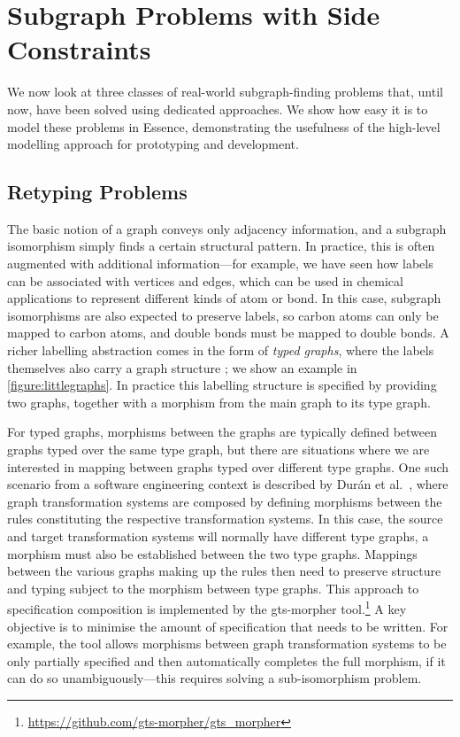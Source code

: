 \documentclass[runningheads]{llncs}
\begin{document}
\section{Subgraph Problems with Side Constraints}\label{section:problems}

We now look at three classes of real-world subgraph-finding problems that, until now, have been
solved using dedicated approaches. We show how easy it is to model these problems in Essence,
demonstrating the usefulness of the high-level modelling approach for prototyping and development.

\subsection{Retyping Problems}\label{section:typegraphs}

The basic notion of a graph conveys only adjacency information, and a subgraph isomorphism simply
finds a certain structural pattern. In practice, this is often augmented with additional
information---for example, we have seen how labels can be associated with vertices and edges, which
can be used in chemical applications to represent different kinds of atom or bond. In this case,
subgraph isomorphisms are also expected to preserve labels, so carbon atoms can only be mapped to
carbon atoms, and double bonds must be mapped to double bonds.  A richer labelling abstraction comes
in the form of \emph{typed graphs}, where the labels themselves also carry a graph structure
\cite{Ehrig+06}; we show an example in \cref{figure:littlegraphs}. In practice this labelling
structure is specified by providing two graphs, together with a morphism from the main graph to its
type graph.

For typed graphs, morphisms between the graphs are typically defined between graphs typed over the
same type graph, but there are situations where we are interested in mapping between graphs typed
over different type graphs.  One such scenario from a software engineering context is described by
Dur{\'a}n et al.~\cite{Duran+12,Duran+17}, where graph transformation systems are composed by
defining morphisms between the rules constituting the respective transformation systems.  In this
case, the source and target transformation systems will normally have different type graphs, a
morphism must also be established between the two type graphs.  Mappings between the various graphs
making up the rules then need to preserve structure and typing subject to the morphism between type
graphs. This approach to specification composition is implemented by the gts-morpher
tool.\footnote{\url{https://github.com/gts-morpher/gts_morpher}} A key objective is to minimise the
amount of specification that needs to be written.  For example, the tool allows morphisms between
graph transformation systems to be only partially specified and then automatically completes the
full morphism, if it can do so unambiguously---this requires solving a sub-isomorphism problem.
\end{document}
